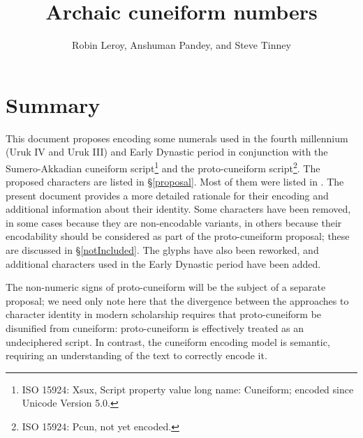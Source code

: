 \documentclass[10pt, a4paper, twoside]{article}
\title{Archaic cuneiform numbers}
\author{Robin Leroy, Anshuman Pandey, and Steve Tinney}
\begin{document}
\maketitle

\tableofcontents

\section{Summary}

This document proposes encoding some numerals used in the fourth millennium (Uruk IV and Uruk III) and Early Dynastic period in conjunction
with the Sumero-Akkadian cuneiform script\footnote{ISO 15924: Xsux, Script property value long name: Cuneiform; encoded since Unicode Version 5.0.}
and the proto-cuneiform script\footnote{ISO 15924: Pcun, not yet encoded.}.
The proposed characters are listed in §\ref{proposal}.
Most of them were listed in \cite{L2/23-190}.
The present document provides a more detailed rationale for their encoding
and additional information about their identity. Some characters have been
removed, in some cases because they are non-encodable variants,
in others because their encodability should be considered as part of the proto-cuneiform proposal;
these are discussed in §\ref{notIncluded}.
The glyphs have also been reworked, and
additional characters used in the Early Dynastic period have been added.

The non-numeric signs of proto-cuneiform will be the subject of a separate proposal;
we need only note here that the divergence between the approaches to character identity
in modern scholarship requires that proto-cuneiform be disunified from cuneiform:
proto-cuneiform is effectively treated as an undeciphered script.
In contrast, the cuneiform encoding model is semantic,
requiring an understanding of the text to correctly encode it.
\end{document}
